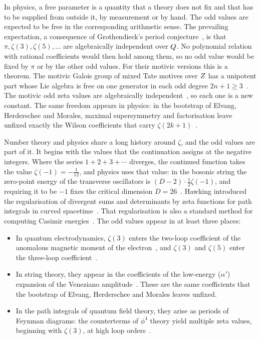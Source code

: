 In physics, a free parameter is a quantity that a theory does not fix and that has to be supplied from outside it,
by measurement or by hand.  The odd values are expected to be free in the corresponding arithmetic sense.  The
prevailing expectation, a consequence of Grothendieck's period conjecture~\cite{grothendieck66,kontsevichzagier01},
is that $\pi,\zeta(3),\zeta(5),\dots$ are algebraically independent over $Q$.  No polynomial relation with rational
coefficients would then hold among them, so no odd value would be fixed by $\pi$ or by the other odd values.  For
their motivic versions this is a theorem.  The motivic Galois group of mixed Tate motives over $Z$ has a unipotent
part whose Lie algebra is free on one generator in each odd degree $2n+1\ge3$~\cite{delignegoncharov05}.  The
motivic odd zeta values are algebraically independent~\cite{brown12}, so each one is a new constant.  The same
freedom appears in physics: in the bootstrap of Elvang, Herderschee and Morales, maximal supersymmetry and
factorisation leave unfixed exactly the Wilson coefficients that carry $\zeta(2k+1)$~\cite{elvang26}.

Number theory and physics share a long history around $\zeta$, and the odd values are part of it.  It begins with
the values that the continuation assigns at the negative integers.  Where the series $1+2+3+\cdots$ diverges, the
continued function takes the value $\zeta(-1)=-\tfrac1{12}$, and physics uses that value: in the bosonic string the
zero-point energy of the transverse oscillators is $(D-2)\cdot\tfrac12\zeta(-1)$, and requiring it to be $-1$ fixes
the critical dimension $D=26$~\cite{polchinski98}.  Hawking introduced the regularisation of divergent sums and
determinants by zeta functions for path integrals in curved spacetime~\cite{hawking77}.  That regularisation is
also a standard method for computing Casimir energies~\cite{elizalde94}.  The odd values appear in at least three
places:
\begin{itemize}
  \item In quantum electrodynamics, $\zeta(3)$ enters the two-loop coefficient of the anomalous magnetic moment of
    the electron~\cite{petermann58,sommerfield57}, and $\zeta(3)$ and $\zeta(5)$ enter the three-loop
    coefficient~\cite{laporta96}.
  \item In string theory, they appear in the coefficients of the low-energy ($\alpha'$) expansion of the Veneziano
    amplitude~\cite{veneziano68}.  These are the same coefficients that the bootstrap of Elvang, Herderschee and
    Morales leaves unfixed.
  \item In the path integrals of quantum field theory, they arise as periods of Feynman diagrams: the counterterms
    of $\phi^4$ theory yield multiple zeta values, beginning with $\zeta(3)$, at high loop
    orders~\cite{broadhurstkreimer97}.
\end{itemize}

